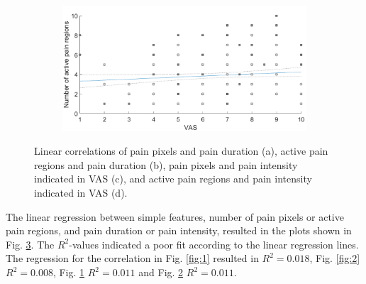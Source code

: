 \begin{figure} [t!]
\begin{subfigure}[b]{0.51\textwidth}
    \caption{}
    \label{fig:3}
  \end{subfigure}
  \hfill
  \hspace{2mm}
  \begin{subfigure}[b]{0.51\textwidth}
    \includegraphics[width=\textwidth]{Figures/vasregion}
       \caption{ }
    \label{fig:4}
  \end{subfigure}  
  \caption{Linear correlations of pain pixels and pain duration (a), active pain regions and pain duration (b), pain pixels and pain intensity indicated in VAS (c), and active pain regions and pain intensity indicated in VAS (d).}
  \label{fig:correlations}
\end{figure}

The linear regression between simple features, number of pain pixels or active pain regions, and pain duration or pain intensity, resulted in the plots shown in Fig. \ref{fig:correlations}. The $R^2$-values indicated a poor fit according to the linear regression lines. The regression for the correlation in Fig. \ref{fig:1} resulted in $R^2 = 0.018$, Fig. \ref{fig:2} $R^2 = 0.008$, Fig. \ref{fig:3} $R^2 = 0.011$ and Fig. \ref{fig:4} $R^2 = 0.011$. 

